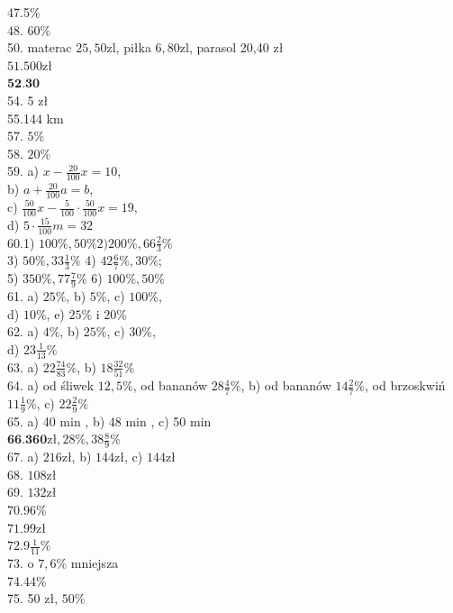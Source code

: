 \documentclass[10pt]{article}
\begin{document}
47.5\%\\
48. 60\%\\
50. materac \(25,50 \mathrm{zl}\), piłka \(6,80 \mathrm{zl}\), parasol 20,40 zł\\
\(51.500 \mathrm{zł}\)\\
\(\mathbf{5 2 . 3 0}\)\\
54. 5 zł\\
55.144 km\\
57. \(5 \%\)\\
58. \(20 \%\)\\
59. a) \(x-\frac{20}{100} x=10\),\\
b) \(a+\frac{20}{100} a=b\),\\
c) \(\frac{50}{100} x-\frac{5}{100} \cdot \frac{50}{100} x=19\),\\
d) \(5 \cdot \frac{15}{100} m=32\)\\
60.1) \(100 \%, 50 \% 2) 200 \%, 66 \frac{2}{3} \%\)\\
3) \(50 \%, 33 \frac{1}{3} \%\) 4) \(42 \frac{6}{7} \%, 30 \%\);\\
5) \(350 \%, 77 \frac{7}{9} \%\) 6) \(100 \%, 50 \%\)\\
61. a) \(25 \%\), b) \(5 \%\), c) \(100 \%\),\\
d) \(10 \%\), e) \(25 \%\) i \(20 \%\)\\
62. a) \(4 \%\), b) \(25 \%\), c) \(30 \%\),\\
d) \(23 \frac{1}{13} \%\)\\
63. a) \(22 \frac{74}{83} \%\), b) \(18 \frac{32}{51} \%\)\\
64. a) od śliwek \(12,5 \%\), od bananów \(28 \frac{4}{7} \%\), b) od bananów \(14 \frac{2}{7} \%\), od brzoskwiń \(11 \frac{1}{9} \%\), c) \(22 \frac{2}{9} \%\)\\
65. a) 40 min , b) 48 min , c) 50 min\\
\(\mathbf{6 6 . 3 6 0} \mathrm{zł}, 28 \%, 38 \frac{8}{9} \%\)\\
67. a) \(216 \mathrm{zł}\), b) \(144 \mathrm{zł}\), c) \(144 \mathrm{zł}\)\\
68. \(108 \mathrm{zł}\)\\
69. \(132 \mathrm{zł}\)\\
70.96\%\\
\(71.99 \mathrm{zł}\)\\
\(72.9 \frac{1}{11} \%\)\\
73. o \(7,6 \%\) mniejsza\\
74.44\%\\
75. 50 zł, \(50 \%\)\\
\end{document}
